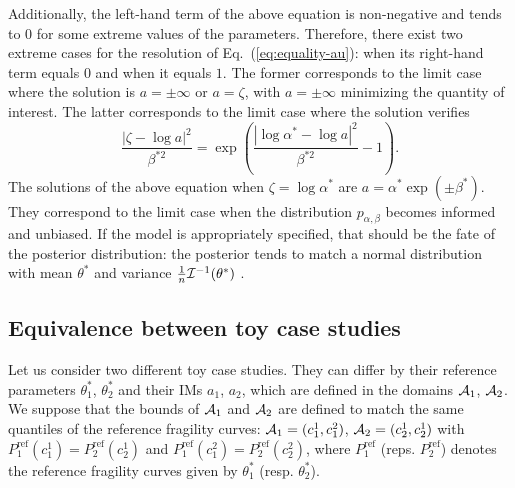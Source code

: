         Additionally, the left-hand term of the above equation is non-negative and tends to $0$ for some extreme values of the parameters.
        Therefore, there exist two extreme cases for the resolution of Eq.~(\ref{eq:equality-au}): when its right-hand term equals $0$ and when it equals $1$. The former corresponds to the limit case where the solution is $a=\pm\infty$ or $a=\zeta$, with $a=\pm\infty$ minimizing the quantity of interest. 
        The latter corresponds to the limit case where the solution verifies
            \begin{equation}
                \frac{|\zeta-\log a|^2}{\beta^{\ast2}} = \exp\left( \frac{|\log\alpha^\ast-\log a|^2}{\beta^{\ast2}} -1\right).
            \end{equation}
        The solutions of the above equation when $\zeta =\log\alpha^\ast$ are $a=\alpha^\ast\exp\left(\pm\beta^\ast\right).$
        They correspond to the limit case when the distribution $p_{\alpha,\beta}$ becomes informed and unbiased. 
        If the model is appropriately specified, that should be the fate of the posterior distribution: the posterior tends to match a normal distribution with mean $\theta^\ast$ and variance $\frac{1}{n}\mathcal{I}^{-1}(\theta^\ast)$ \cite{van_der_vaart_asymptotic_1992}.
    
        
    
    
    
    
    \subsection{Equivalence between toy case studies}\label{app:equiv-toy}
    
        Let us consider two different toy case studies. They can differ by their reference parameters $\theta_1^\ast$, $\theta_2^\ast$ and their IMs $a_1$, $a_2$, which are defined in the domains $\mathcal{A}_1$, $\mathcal{A}_2$.
        We suppose that the bounds of $\mathcal{A}_1$ and $\mathcal{A}_2$ are defined to match the same quantiles of the reference fragility curves: $\mathcal{A}_1=(c_1^1,c_1^2)$, $\mathcal{A}_2=(c_2^1,c_2^1)$ with $P^{\mathrm{ref}}_1(c_1^1)=P^{\mathrm{ref}}_2(c_2^1)$ and $P^{\mathrm{ref}}_1(c_1^2)=P^{\mathrm{ref}}_2(c_2^2)$, where $P^{\mathrm{ref}}_1$ (reps. $P^{\mathrm{ref}}_2$) denotes the reference fragility curves given by $\theta_1^\ast$ (resp. $\theta^\ast_2$).
    
